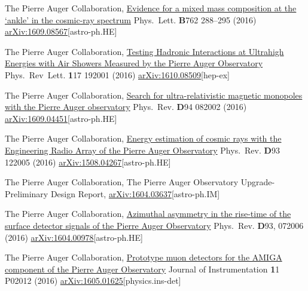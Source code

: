 \begin{etaremune}
\item {}The Pierre Auger Collaboration, \href{http://dx.doi.org/10.1016/j.physletb.2016.09.039}{{Evidence for a mixed mass composition at the ‘ankle’ in the cosmic-ray spectrum}} Phys.\ Lett. {\textbf B762} 288--295 (2016) \href{http://arxiv.org/abs/1609.08567}{arXiv:1609.08567}[astro-ph.HE]

\item {}The Pierre Auger Collaboration, \href{https://doi.org/10.1103/PhysRevLett.117.192001}{{Testing Hadronic Interactions at Ultrahigh Energies with Air Showers Measured by the Pierre Auger Observatory}} Phys.\ Rev\  Lett.  {\textbf 117} 192001 (2016) \href{http://arxiv.org/abs/1610.08509}{arXiv:1610.08509}[hep-ex]

\item {}The Pierre Auger Collaboration, \href{https://doi.org/10.1103/PhysRevD.94.082002}{{Search for ultra-relativistic magnetic monopoles with the Pierre Auger observatory}} Phys.\ Rev. {\textbf D94} 082002 (2016) \href{http://arxiv.org/abs/1609.04451}{arXiv:1609.04451}[astro-ph.HE]

\item {}The Pierre Auger Collaboration, \href{https://doi.org/10.1103/PhysRevD.93.122005}{{Energy estimation of cosmic rays with the Engineering Radio Array of the Pierre Auger Observatory}} Phys.\ Rev. {\textbf D93} 122005 (2016) \href{http://arxiv.org/abs/1508.04267}{arXiv:1508.04267}[astro-ph.HE]

\item {} The Pierre Auger Collaboration, {{The Pierre Auger Observatory Upgrade-Preliminary Design Report}}, \href{http://arxiv.org/abs/1604.03637}{arXiv:1604.03637}[astro-ph.IM]

\item {}The Pierre Auger Collaboration, \href{http://journals.aps.org/prd/abstract/10.1103/PhysRevD.93.072006}{{Azimuthal asymmetry in the rise-time of the surface detector signals of the Pierre Auger Observatory}} Phys.\ Rev. {\textbf D93}, 072006 (2016) \href{http://arxiv.org/abs/1604.00978}{arXiv:1604.00978}[astro-ph.HE]

\item {}The Pierre Auger Collaboration, \href{http://iopscience.iop.org/article/10.1088/1748-0221/11/02/P02012}{{Prototype muon detectors for the AMIGA component of the Pierre Auger Observatory}} Journal of Instrumentation {\textbf 11} P02012 (2016) \href{http://arxiv.org/abs/1605.01625}{arXiv:1605.01625}[physics.ins-det]


\end{etaremune}
